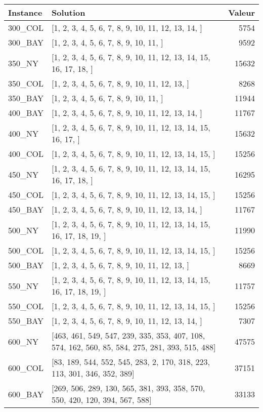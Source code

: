\documentclass[main.tex]{subfiles}
\begin{document}
\newpage
\begin{center}
\renewcommand{\arraystretch}{1.4} 
\begin{tabular}{llr}\hline
\textbf{Instance} & \textbf{Solution} & \textbf{Valeur} \\\hline

300\_COL & [1, 2, 3, 4, 5, 6, 7, 8, 9, 10, 11, 12, 13, 14, ] & 5754\\
300\_BAY & [1, 2, 3, 4, 5, 6, 7, 8, 9, 10, 11, ] & 9592\\
350\_NY & [1, 2, 3, 4, 5, 6, 7, 8, 9, 10, 11, 12, 13, 14, 15, 16, 17, 18, ] & 15632\\
350\_COL & [1, 2, 3, 4, 5, 6, 7, 8, 9, 10, 11, 12, 13, ] & 8268\\
350\_BAY & [1, 2, 3, 4, 5, 6, 7, 8, 9, 10, 11, ] & 11944\\
400\_BAY & [1, 2, 3, 4, 5, 6, 7, 8, 9, 10, 11, 12, 13, 14, ] & 11767\\
400\_NY & [1, 2, 3, 4, 5, 6, 7, 8, 9, 10, 11, 12, 13, 14, 15, 16, 17, ] & 15632\\
400\_COL & [1, 2, 3, 4, 5, 6, 7, 8, 9, 10, 11, 12, 13, 14, 15, ] & 15256\\
450\_NY & [1, 2, 3, 4, 5, 6, 7, 8, 9, 10, 11, 12, 13, 14, 15, 16, 17, 18, ] & 16295\\
450\_COL & [1, 2, 3, 4, 5, 6, 7, 8, 9, 10, 11, 12, 13, 14, 15, ] & 15256\\
450\_BAY & [1, 2, 3, 4, 5, 6, 7, 8, 9, 10, 11, 12, 13, 14, ] & 11767\\
500\_NY & [1, 2, 3, 4, 5, 6, 7, 8, 9, 10, 11, 12, 13, 14, 15, 16, 17, 18, 19, ] & 11990\\
500\_COL & [1, 2, 3, 4, 5, 6, 7, 8, 9, 10, 11, 12, 13, 14, 15, ] & 15256\\
500\_BAY & [1, 2, 3, 4, 5, 6, 7, 8, 9, 10, 11, 12, 13, ] & 8669\\
550\_NY & [1, 2, 3, 4, 5, 6, 7, 8, 9, 10, 11, 12, 13, 14, 15, 16, 17, 18, 19, ] & 11757\\
550\_COL & [1, 2, 3, 4, 5, 6, 7, 8, 9, 10, 11, 12, 13, 14, 15, ] & 15256\\
550\_BAY & [1, 2, 3, 4, 5, 6, 7, 8, 9, 10, 11, 12, 13, 14, ] & 7307\\
600\_NY & [463, 461, 549, 547, 239, 335, 353, 407, 108, 574, 162, 560, 85, 584, 275, 281, 393, 515, 488] & 47575\\
600\_COL & [83, 189, 544, 552, 545, 283, 2, 170, 318, 223, 113, 301, 346, 352, 389] & 37151\\
600\_BAY & [269, 506, 289, 130, 565, 381, 393, 358, 570, 550, 420, 120, 394, 567, 588] & 33133\\

\end{tabular}
\end{center}
\end{document}
